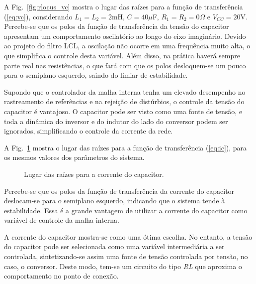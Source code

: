   A Fig.~\ref{fig:rlocus_vc} mostra o lugar das raízes para a função de transferência (\ref{eq:vc}), considerando $L_1=L_2=2$mH, $C=40\mu$F, $R_1=R_2=0\Omega$ e $V_{CC}=20$V. Percebe-se que os polos da função de transferência da tensão do capacitor apresentam um comportamento oscilatório ao longo do eixo imaginário. Devido ao projeto do filtro LCL, a oscilação não ocorre em uma frequência muito alta, o que simplifica o controle desta variável. Além disso, na prática haverá sempre parte real nas resistências, o que fará com que os polos desloquem-se um pouco para o semiplano esquerdo, saindo do limiar de estabilidade.

  Supondo que o controlador da malha interna tenha um elevado desempenho no rastreamento de referências e na rejeição de distúrbios, o controle da tensão do capacitor é vantajoso. O capacitor pode ser visto como uma fonte de tensão, e toda a dinâmica do inversor e do indutor do lado do conversor podem ser ignorados, simplificando o controle da corrente da rede.

  A Fig.~\ref{fig:rlocus_ic} mostra o lugar das raízes para a função de transferência (\ref{eq:ic}), para os mesmos valores dos parâmetros do sistema.

  \begin{figure}[htb]
    \centering{
      }
    \renewcommand\figurename{Fig.}
    \caption{Lugar das raízes para a corrente do capacitor.}
    \label{fig:rlocus_ic}
  \end{figure}

  Percebe-se que os polos da função de transferência da corrente do capacitor deslocam-se para o semiplano esquerdo, indicando que o sistema tende à estabilidade. Essa é a grande vantagem de utilizar a corrente do capacitor como variável de controle da malha interna.

  A corrente do capacitor mostra-se como uma ótima escolha. No entanto, a tensão do capacitor pode ser selecionada como uma variável intermediária a ser controlada, sintetizando-se assim uma fonte de tensão controlada por tensão, no caso, o conversor. Deste modo, tem-se um circuito do tipo \emph{RL} que aproxima o comportamento no ponto de conexão.



